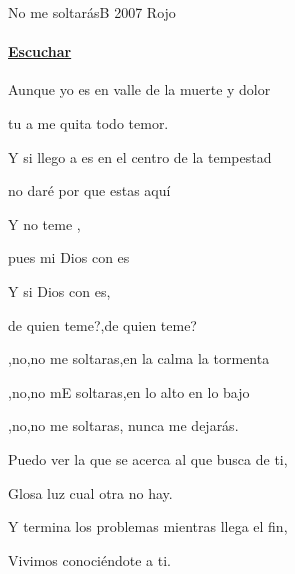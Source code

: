\documentclass[12pt, spanish]{book}
\begin{document}
    \begin{song}{No me soltarás}{B}
    {2007} %
    {Rojo}
    {} %
    {}
        \ifChordBk
            \paragraph{\mbox{}\hfill\protect\href{https://open.spotify.com/intl-es/track/3BbIimwg59f6VMAPhREKPy}{Escuchar}\mbox{}\hfill}
        \fi


        \begin{SBOpGroup}
            Aunque yo es en valle de la muerte y dolor

            tu a me quita todo temor.

            Y si llego a es en el centro de la tempestad

            no daré por que estas aquí
        \end{SBOpGroup}

        \begin{SBOpGroup}
            Y no teme   ,

            pues mi Dios con es

            Y si Dios con es,

            de quien teme?,de quien teme?
        \end{SBOpGroup}

        \begin{SBChorus}
            ,no,no me soltaras,en la calma la tormenta

            ,no,no mE soltaras,en lo alto en lo bajo

            ,no,no me soltaras, nunca me dejarás.

            Puedo ver la  que se acerca al que busca de ti,

            Glosa luz cual otra no hay.

            Y termina los problemas mientras llega el fin,

            Vivimos conociéndote a ti.
        \end{SBChorus}


\end{song}
\end{document}

